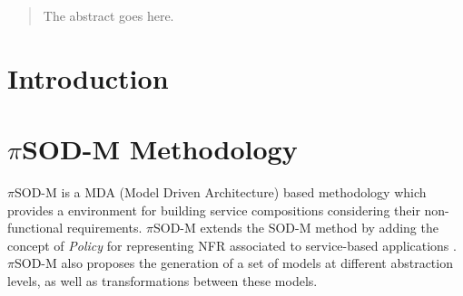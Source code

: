 \documentclass[conference]{IEEEtran}
\begin{document}
\maketitle


\begin{abstract}
The abstract goes here.
\end{abstract}





%
\IEEEpeerreviewmaketitle



\section{Introduction}   

\section{$\pi$SOD-M Methodology}

$\pi$SOD-M \cite{placido2012} is a MDA (Model Driven Architecture) based
methodology which provides a environment for building service compositions
considering their non-functional requirements. $\pi$SOD-M extends the SOD-M \cite{valeriaThesis} method by adding
the concept of \textit{Policy} \cite{Espinosa-OviedoVZC09,Espinosa-Oviedo2011a}
for representing NFR associated to service-based applications
\cite{Placido2010LTPD}. $\pi$SOD-M also proposes the generation of a set of
models at different abstraction levels, as well as transformations between these
models.
\end{document}
